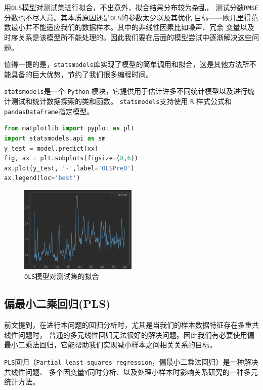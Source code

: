 \documentclass[11pt,a4paper]{elegantpaper}
\begin{document}
\begin{multicols}{2}
用\lstinline{OLS}模型对测试集进行拟合，不出意外，拟合结果分布较为杂乱，
测试分数\lstinline{RMSE}分数也不尽人意。其本质原因还是\lstinline{OLS}的参数太少以及其优化
目标——欧几里得范数最小并不能适应我们的数据样本。其中的非线性因素比如噪声、冗余
变量以及时序关系是该模型所不能处理的。因此我们要在后面的模型尝试中逐渐解决这些问题。

值得一提的是，\lstinline{statsmodels}库实现了模型的简单调用和拟合，这是其他方法所不能具备的巨大优势，节约了我们很多编程时间。

\lstinline{statsmodels}是一个 \lstinline{Python} 模块，它提供用于估计许多不同统计模型以及进行统计测试和统计数据探索的类和函数。
\lstinline{statsmodels}支持使用 \lstinline{R} 样式公式和\lstinline{pandasDataFrame}指定模型。

\begin{lstlisting}[language=Python]
from matplotlib import pyplot as plt
import statsmodels.api as sm
y_test = model.predict(xx)
fig, ax = plt.subplots(figsize=(8,6))
ax.plot(y_test, '-',label='OLSPreD')
ax.legend(loc='best')
\end{lstlisting}

\begin{figure}[H]
  \centering
  \includegraphics[width=0.5\textwidth]{images/FF.png}
  \caption{\lstinline{OLS}模型对测试集的拟合} 
\end{figure}

\subsection{偏最小二乘回归(PLS)}

前文提到，在进行本问题的回归分析时，尤其是当我们的样本数据特征存在多重共线性问题时，
普通的多元线性回归无法很好的解决问题。因此我们有必要使用偏最小二乘法回归，它能帮助我们实现减小样本之间相关关系的目标。

\lstinline{PLS}回归（\lstinline{Partial least squares regression}，偏最小二乘法回归）是一种解决共线性问题、
多个因变量\lstinline{Y}同时分析、以及处理小样本时影响关系研究的一种多元统计方法。


\end{multicols}
\end{document}
